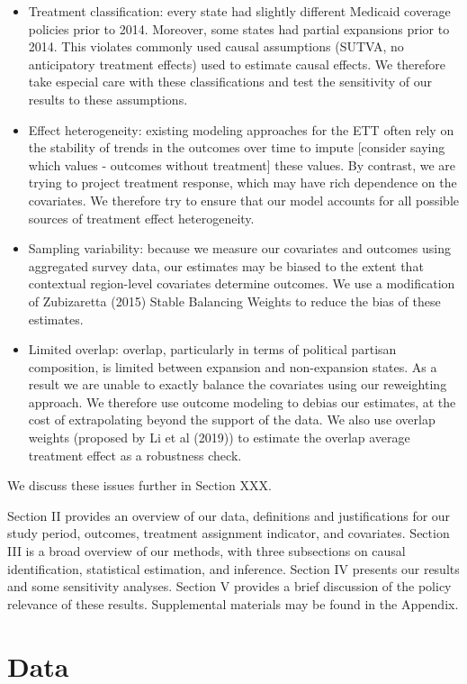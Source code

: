 \documentclass[final]{article}
\begin{document}
\begin{itemize}
    \item Treatment classification: every state had slightly different Medicaid coverage policies prior to 2014. Moreover, some states had partial expansions prior to 2014. This violates commonly used causal assumptions (SUTVA, no anticipatory treatment effects) used to estimate causal effects. We therefore take especial care with these classifications and test the sensitivity of our results to these assumptions.
    \item Effect heterogeneity: existing modeling approaches for the ETT often rely on the stability of trends in the outcomes over time to impute [consider saying which values - outcomes without treatment] these values. By contrast, we are trying to project treatment response, which may have rich dependence on the covariates. We therefore try to ensure that our model accounts for all possible sources of treatment effect heterogeneity.
    \item Sampling variability: because we measure our covariates and outcomes using aggregated survey data, our estimates may be biased to the extent that contextual region-level covariates determine outcomes. We use a modification of Zubizaretta (2015) Stable Balancing Weights to reduce the bias of these estimates.
    \item Limited overlap: overlap, particularly in terms of political partisan composition, is limited between expansion and non-expansion states. As a result we are unable to exactly balance the covariates using our reweighting approach. We therefore use outcome modeling to debias our estimates, at the cost of extrapolating beyond the support of the data. We also use overlap weights (proposed by Li et al (2019)) to estimate the overlap average treatment effect as a robustness check.
\end{itemize}

We discuss these issues further in Section XXX.

Section II provides an overview of our data, definitions and justifications for our study period, outcomes, treatment assignment indicator, and covariates. Section III is a broad overview of our methods, with three subsections on causal identification, statistical estimation, and inference. Section IV presents our results and some sensitivity analyses. Section V provides a brief discussion of the policy relevance of these results. Supplemental materials may be found in the Appendix.

\section{Data}
\end{document}
